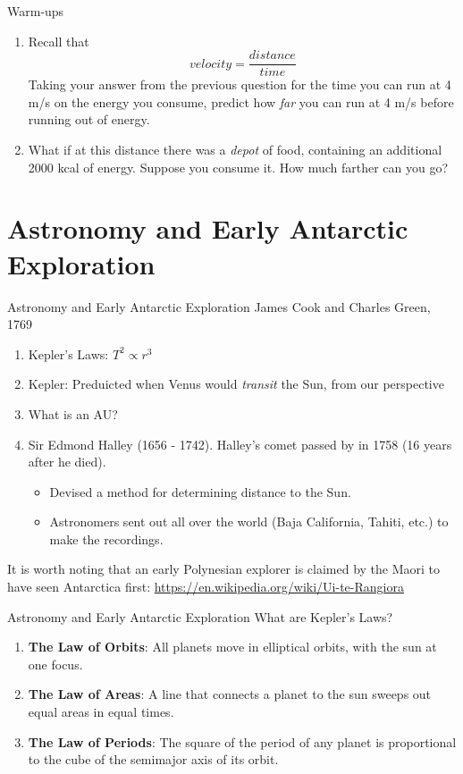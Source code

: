 \documentclass{beamer}
\begin{document}
\begin{frame}{Warm-ups}
\begin{enumerate}
\item Recall that 
\begin{equation}
velocity = \frac{distance}{time}
\end{equation}
Taking your answer from the previous question for the time you can run at 4 m/s on the energy you consume, predict how \textit{far} you can run at 4 m/s before running out of energy.
\item What if at this distance there was a \textit{depot} of food, containing an additional 2000 kcal of energy.  Suppose you consume it.  How much farther can you go?
\end{enumerate}
\end{frame}

\section{Astronomy and Early Antarctic Exploration}

\begin{frame}{Astronomy and Early Antarctic Exploration}
James Cook and Charles Green, 1769
\begin{enumerate}
\item Kepler's Laws: $T^2 \propto r^3$
\item Kepler: Preduicted when Venus would \textit{transit} the Sun, from our perspective
\item What is an AU?
\item Sir Edmond Halley (1656 - 1742).  Halley's comet passed by in 1758 (16 years after he died).
\begin{itemize}
\item Devised a method for determining distance to the Sun.
\item Astronomers sent out all over the world (Baja California, Tahiti, etc.) to make the recordings.
\end{itemize}
\end{enumerate}
It is worth noting that an early Polynesian explorer is claimed by the Maori to have seen Antarctica first: \url{https://en.wikipedia.org/wiki/Ui-te-Rangiora}
\end{frame}

\begin{frame}{Astronomy and Early Antarctic Exploration}
What are Kepler's Laws?
\begin{enumerate}
\item \textbf{The Law of Orbits}: All planets move in elliptical orbits, with the sun at one focus.
\item \textbf{The Law of Areas}: A line that connects a planet to the sun sweeps out equal areas in equal times.
\item \textbf{The Law of Periods}: The square of the period of any planet is proportional to the cube of the semimajor axis of its orbit.
\end{enumerate}
\end{frame}
\end{document}
